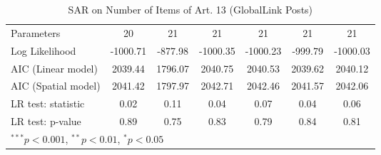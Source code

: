 \begin{table}[!h]
\begin{center}
\begin{tabular}{l c c c c c c }
Parameters              & 20           & 21           & 21           & 21           & 21           & 21           \\
Log Likelihood          & -1000.71     & -877.98      & -1000.35     & -1000.23     & -999.79      & -1000.03     \\
AIC (Linear model)      & 2039.44      & 1796.07      & 2040.75      & 2040.53      & 2039.62      & 2040.12      \\
AIC (Spatial model)     & 2041.42      & 1797.97      & 2042.71      & 2042.46      & 2041.57      & 2042.06      \\
LR test: statistic      & 0.02         & 0.11         & 0.04         & 0.07         & 0.04         & 0.06         \\
LR test: p-value        & 0.89         & 0.75         & 0.83         & 0.79         & 0.84         & 0.81         \\
\bottomrule
\multicolumn{7}{l}{\scriptsize{$^{***}p<0.001$, $^{**}p<0.01$, $^*p<0.05$}}
\end{tabular}
\caption{SAR on Number of Items of Art. 13 (GlobalLink Posts)}
\label{table:coefficients}
\end{center}
\end{table}
